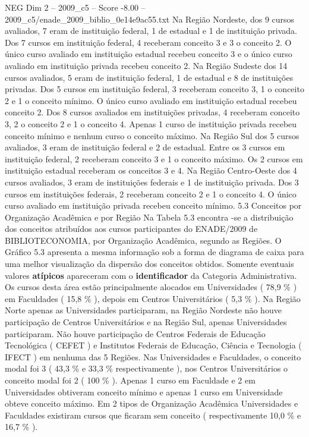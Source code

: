 \begin{textsample}{NEG Dim 2 – 2009\_c5 – Score -8.00 – 2009\_c5/enade\_2009\_biblio\_0e14e9ac55.txt}
Na Região Nordeste, dos 9 cursos avaliados, 7 eram de instituição federal, 1 de estadual e 1 de instituição privada.
Dos 7 cursos em instituição federal, 4 receberam conceito 3 e 3 o conceito 2.
O único curso avaliado em instituição estadual recebeu conceito 3 e o único curso avaliado em instituição privada recebeu conceito 2.
Na Região Sudeste dos 14 cursos avaliados, 5 eram de instituição federal, 1 de estadual e 8 de instituições privadas.
Dos 5 cursos em instituição federal, 3 receberam conceito 3, 1 o conceito 2 e 1 o conceito mínimo.
O único curso avaliado em instituição estadual recebeu conceito 2.
Dos 8 cursos avaliados em instituições privadas, 4 receberam conceito 3, 2 o conceito 2 e 1 o conceito 4.
Apenas 1 curso de instituição privada recebeu conceito mínimo e nenhum curso o conceito máximo.
Na Região Sul dos 5 cursos avaliados, 3 eram de instituição federal e 2 de estadual.
Entre os 3 cursos em instituição federal, 2 receberam conceito 3 e 1 o conceito máximo.
Os 2 cursos em instituição estadual receberam os conceitos 3 e 4.
Na Região Centro-Oeste dos 4 cursos avaliados, 3 eram de instituições federais e 1 de instituição privada.
Dos 3 cursos em instituições federais, 2 receberam conceito 2 e 1 o conceito 4.
O único curso avaliado em instituição privada recebeu conceito mínimo. 5.3 Conceitos por Organização Acadêmica e por Região Na Tabela 5.3 encontra -se a distribuição dos conceitos atribuídos aos cursos participantes do ENADE/2009 de BIBLIOTECONOMIA, por Organização Acadêmica, segundo as Regiões.
O Gráfico 5.3 apresenta a mesma informação sob a forma de diagrama de caixa para uma melhor visualização da dispersão dos conceitos obtidos.
Somente eventuais valores \textbf{atípicos} apareceram com o \textbf{identificador} da Categoria Administrativa.
Os cursos desta área estão principalmente alocados em Universidades ( 78,9 \% ) em Faculdades ( 15,8 \% ), depois em Centros Universitários ( 5,3 \% ).
Na Região Norte apenas as Universidades participaram, na Região Nordeste não houve participação de Centros Universitários e na Região Sul, apenas Universidades participaram.
Não houve participação de Centros Federais de Educação Tecnológica ( CEFET ) e Institutos Federais de Educação, Ciência e Tecnologia ( IFECT ) em nenhuma das 5 Regiões.
Nas Universidades e Faculdades, o conceito modal foi 3 ( 43,3 \% e 33,3 \% respectivamente ), nos Centros Universitários o conceito modal foi 2 ( 100 \% ).
Apenas 1 curso em Faculdade e 2 em Universidades obtiveram conceito mínimo e apenas 1 curso em Universidade obteve conceito máximo.
Em 2 tipos de Organização Acadêmica Universidades e Faculdades existiram cursos que ficaram sem conceito ( respectivamente 10,0 \% e 16,7 \% ).

\end{textsample}
